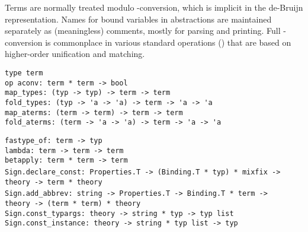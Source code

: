 \begin{isabellebody}
\begin{isamarkuptext}
  Terms are normally treated modulo \isa{{\isasymalpha}}-conversion, which is
  implicit in the de-Bruijn representation.  Names for bound variables
  in abstractions are maintained separately as (meaningless) comments,
  mostly for parsing and printing.  Full \isa{{\isasymalpha}{\isasymbeta}{\isasymeta}}-conversion is
  commonplace in various standard operations ()
  that are based on higher-order unification and matching.%
\end{isamarkuptext}%
\isamarkuptrue%
%
\isadelimmlref
%
\endisadelimmlref
%
\isatagmlref
%
\begin{isamarkuptext}%
\begin{mldecls}
  \verb|type term| \\
  \verb|op aconv: term * term -> bool| \\
  \verb|map_types: (typ -> typ) -> term -> term| \\
  \verb|fold_types: (typ -> 'a -> 'a) -> term -> 'a -> 'a| \\
  \verb|map_aterms: (term -> term) -> term -> term| \\
  \verb|fold_aterms: (term -> 'a -> 'a) -> term -> 'a -> 'a| \\
  \end{mldecls}
  \begin{mldecls}
  \verb|fastype_of: term -> typ| \\
  \verb|lambda: term -> term -> term| \\
  \verb|betapply: term * term -> term| \\
  \verb|Sign.declare_const: Properties.T -> (Binding.T * typ) * mixfix ->|\isasep\isanewline%
\verb|  theory -> term * theory| \\
  \verb|Sign.add_abbrev: string -> Properties.T -> Binding.T * term ->|\isasep\isanewline%
\verb|  theory -> (term * term) * theory| \\
  \verb|Sign.const_typargs: theory -> string * typ -> typ list| \\
  \verb|Sign.const_instance: theory -> string * typ list -> typ| \\
  \end{mldecls}

  \begin{description}


\end{description}
\end{isamarkuptext}
\end{isabellebody}
